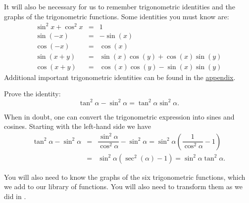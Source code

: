 \documentclass{book}
\begin{document}
It will also be necessary for us to remember trigonometric identities and the graphs of the trigonometric functions. Some identities you must know are:
\begin{eqnarray}
\sin^2 x + \cos^2x &=& 1\\
\sin(-x) &=& -\sin (x)\\
\cos(-x) &=& \cos(x)\\
\sin(x+y) &=& \sin(x)\cos(y) + \cos(x)\sin(y)\\
\cos(x+y) &=& \cos(x)\cos(y) - \sin(x)\sin(y)
\end{eqnarray}
Additional important trigonometric identities can be found in the \hyperref[chap:formulas]{appendix}. 

\begin{Exam} Prove the identity: \[\tan^2\alpha - \sin^2\alpha = \tan^2\alpha\sin^2\alpha.\]

When in doubt, one can convert the trigonometric expression into sines and cosines. Starting with the left-hand side we have
\begin{eqnarray*}
\tan^2\alpha - \sin^2\alpha &=& \dfrac{\sin^2\alpha}{\cos^2\alpha} - \sin^2\alpha = \sin^2\alpha\left(\dfrac{1}{\cos^2\alpha} - 1\right) \\
&=& \sin^2\alpha(\sec^2(\alpha) - 1) = \sin^2\alpha\tan^2\alpha. 
\end{eqnarray*}
\end{Exam}\vs

You will also need to know the graphs of the six trigonometric functions, which we add to our library of functions. You will also need to transform them as we did in .


\begin{center}
\end{center}
\end{document}
